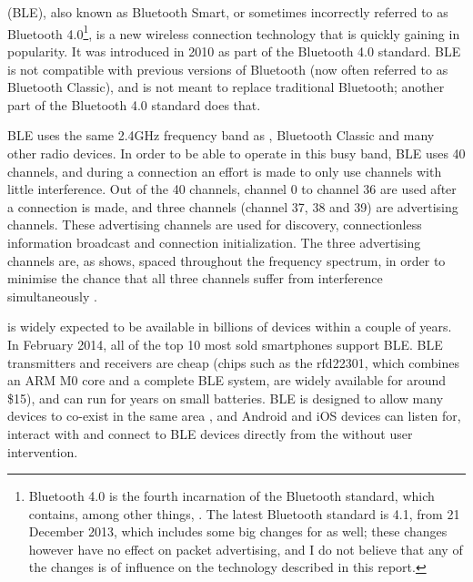 \section{\BLE}
\BLE (BLE), also known as Bluetooth Smart, or sometimes incorrectly referred to as Bluetooth 4.0\footnote{Bluetooth 4.0 is the fourth incarnation of the Bluetooth standard, which contains, among other things, \BLE. The latest Bluetooth standard is 4.1, from 21 December 2013, which includes some big changes for \BLE as well; these changes however have no effect on packet advertising, and I do not believe that any of the changes is of influence on the technology described in this report.}, is a new wireless connection technology that is quickly gaining in popularity.
It was introduced in 2010 as part of the Bluetooth 4.0 standard.
BLE is not compatible with previous versions of Bluetooth (now often referred to as Bluetooth Classic), and is not meant to replace traditional Bluetooth; another part of the Bluetooth 4.0 standard does that.


BLE uses the same 2.4GHz frequency band as \wifi, Bluetooth Classic and many other radio devices.
In order to be able to operate in this busy band, BLE uses 40 channels, and during a connection an effort is made to only use channels with little interference.
Out of the 40 channels, channel 0 to channel 36 are used after a connection is made, and three channels (channel 37, 38 and 39) are advertising channels.
These advertising channels are used for discovery, connectionless information broadcast and connection initialization.
The three advertising channels are, as  shows, spaced throughout the frequency spectrum, in order to minimise the chance that all three channels suffer from interference simultaneously \citep{heydon2013bluetooth}.


\BLE is widely expected to be available in billions of devices within a couple of years.
In February 2014, all of the top 10 most sold smartphones support BLE.
BLE transmitters and receivers are cheap (chips such as the rfd22301, which combines an ARM M0 core and a complete BLE system, are widely available for around \$15), and can run for years on small batteries.
BLE is designed to allow many devices to co-exist in the same area \citep{heydon2013bluetooth}, and Android and iOS devices can listen for, interact with and connect to BLE devices directly from the \app without user intervention.

